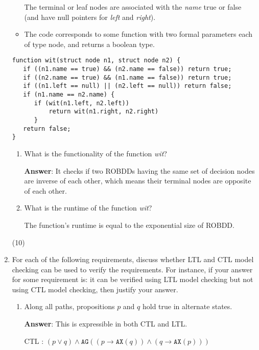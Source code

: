 \documentclass[11pt]{article}
\newcommand{\ax}[1]{\texttt{AX}(#1)}
\newcommand{\ag}[1]{\texttt{AG}(#1)}
\begin{document}
\begin{enumerate}
\begin{itemize}
    The terminal or leaf nodes are associated with the \emph{name}
    true or false (and have null pointers for \emph{left} and
    \emph{right}).

  \item The code corresponds to some function with two formal
    parameters each of type node, and returns a boolean type.

    \end{itemize}

\begin{verbatim}
function wit(struct node n1, struct node n2) {
   if ((n1.name == true) && (n2.name == false)) return true;
   if ((n2.name == true) && (n1.name == false)) return true;
   if ((n1.left == null) || (n2.left == null)) return false;
   if (n1.name == n2.name) {
      if (wit(n1.left, n2.left))
          return wit(n1.right, n2.right)
      }
   return false;
}
\end{verbatim}

\begin{enumerate}
\item What is the functionality of the function \emph{wit}?

\textbf{Answer}: It checks if two ROBDDs having the same set of decision nodes are inverse of each other, which means their terminal nodes are opposite of each other. 


\item What is the runtime of the function \emph{wit}?

The function's runtime is equal to the exponential size of ROBDD. 


\end{enumerate}
\hfill (10)

\item
  For each of the following requirements, discuss whether LTL and CTL
  model checking can be used to verify the requirements. For instance,
  if your answer for some requirement is: it can be verified using LTL
  model checking but not using CTL model checking, then justify your
  answer. 
  \begin{enumerate}
  \item Along all paths, propositions $p$ and $q$ hold true in alternate
    states.
    
\textbf{Answer}: 
    This is expressible in both CTL and LTL. 

    CTL : $ (p \lor q) \land \ag{ (p \rightarrow \ax{q}) \land (q \rightarrow \ax{p})}$


\end{enumerate}
\end{enumerate}
\end{document}

